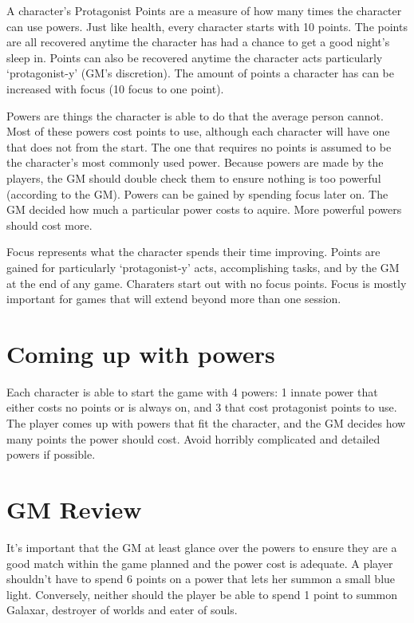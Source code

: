 \begin{flushleft}
A character's Protagonist Points are a measure of how many times the character
can use powers. Just like health, every character starts with 10 points. The
points are all recovered anytime the character has had a chance to get a good
night's sleep in. Points can also be recovered anytime the character acts
particularly `protagonist-y' (GM's discretion). The amount of points a
character has can be increased with focus (10 focus to one point).

Powers are things the character is able to do that the average person cannot.
Most of these powers cost points to use, although each character will have
one that does not from the start. The one that requires no points is assumed
to be the character's most commonly used power. Because powers are made by the
players, the GM should double check them to ensure nothing is too powerful
(according to the GM). Powers can be gained by spending focus later on. The GM
decided how much a particular power costs to aquire. More powerful powers
should cost more.

Focus represents what the character spends their time improving. Points are
gained for particularly `protagonist-y' acts, accomplishing tasks, and by
the GM at the end of any game. Charaters start out with no focus points. Focus
is mostly important for games that will extend beyond more than one session.

\section*{Coming up with powers}

Each character is able to start the game with 4 powers: 1 innate power that
either costs no points or is always on, and 3 that cost protagonist points to
use. The player comes up with powers that fit the character, and the GM
decides how many points the power should cost. Avoid horribly complicated and
detailed powers if possible.

\section*{GM Review}
It's important that the GM at least glance over the powers to ensure they are
a good match within the game planned and the power cost is adequate. A player
shouldn't have to spend 6 points on a power that lets her summon a small blue
light. Conversely, neither should the player be able to spend 1 point to
summon Galaxar, destroyer of worlds and eater of souls.


\end{flushleft}
